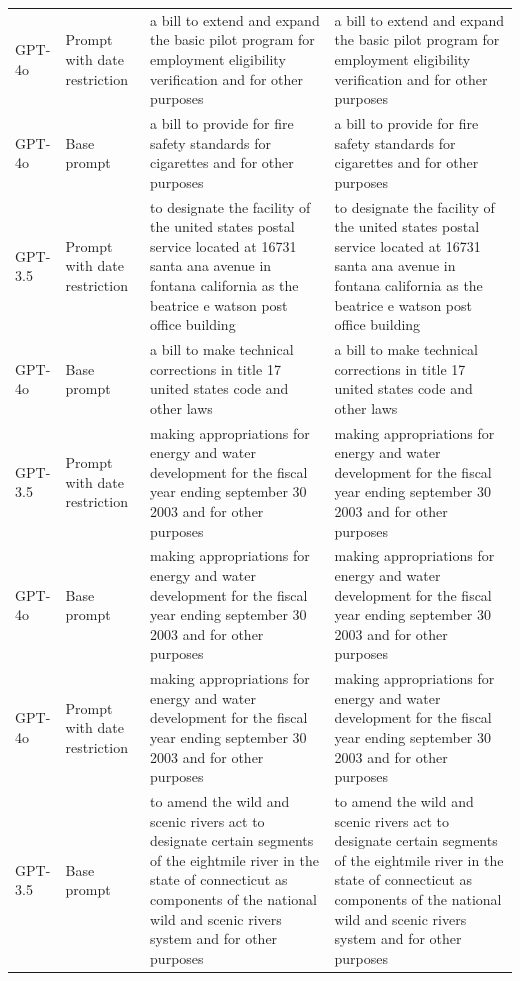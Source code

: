 \begin{longtable}{>{\raggedright\arraybackslash}p{1.4cm}>{\raggedright\arraybackslash}p{1.4cm}>{\raggedright\arraybackslash}p{5.5cm}>{\raggedright\arraybackslash}p{5.5cm}}
GPT-4o & Prompt with date restriction & a bill to extend and expand the basic pilot program for employment eligibility verification and for other purposes & a bill to extend and expand the basic pilot program for employment eligibility verification and for other purposes\\
GPT-4o & Base prompt & a bill to provide for fire safety standards for cigarettes and for other purposes & a bill to provide for fire safety standards for cigarettes and for other purposes\\
GPT-3.5 & Prompt with date restriction & to designate the facility of the united states postal service located at 16731 santa ana avenue in fontana california as the beatrice e watson post office building & to designate the facility of the united states postal service located at 16731 santa ana avenue in fontana california as the beatrice e watson post office building\\
GPT-4o & Base prompt & a bill to make technical corrections in title 17 united states code and other laws & a bill to make technical corrections in title 17 united states code and other laws\\
GPT-3.5 & Prompt with date restriction & making appropriations for energy and water development for the fiscal year ending september 30 2003 and for other purposes & making appropriations for energy and water development for the fiscal year ending september 30 2003 and for other purposes\\
GPT-4o & Base prompt & making appropriations for energy and water development for the fiscal year ending september 30 2003 and for other purposes & making appropriations for energy and water development for the fiscal year ending september 30 2003 and for other purposes\\
GPT-4o & Prompt with date restriction & making appropriations for energy and water development for the fiscal year ending september 30 2003 and for other purposes & making appropriations for energy and water development for the fiscal year ending september 30 2003 and for other purposes\\
GPT-3.5 & Base prompt & to amend the wild and scenic rivers act to designate certain segments of the eightmile river in the state of connecticut as components of the national wild and scenic rivers system and for other purposes & to amend the wild and scenic rivers act to designate certain segments of the eightmile river in the state of connecticut as components of the national wild and scenic rivers system and for other purposes\\

\end{longtable}

